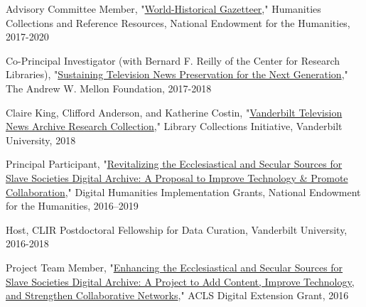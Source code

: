 \documentclass[10pt]{res} %
\begin{document}
\begin{resume}
\begin{hangparas}{.25in}{1}Advisory Committee Member, "\href{https://securegrants.neh.gov/publicquery/main.aspx?f=1\&gn=PW-253719-17}{World-Historical Gazetteer}," Humanities Collections and Reference Resources, National Endowment for the Humanities, 2017-2020\end{hangparas}

\begin{hangparas}{.25in}{1}Co-Principal Investigator (with Bernard F. Reilly of the Center for Research Libraries), "\href{https://news.vanderbilt.edu/2017/09/27/workshop-will-chart-the-future-of-television-news-preservation/}{Sustaining Television News Preservation for the Next Generation}," The Andrew W. Mellon Foundation, 2017-2018\end{hangparas}

\begin{hangparas}{.25in}{1}Claire King, Clifford Anderson, and Katherine Costin, "\href{https://news.vanderbilt.edu/2018/05/16/10-faculty-proposals-funded-through-new-library-collections-initiative}{Vanderbilt Television News Archive Research Collection}," Library Collections Initiative, Vanderbilt University, 2018\end{hangparas}

\begin{hangparas}{.25in}{1}Principal Participant, "\href{https://securegrants.neh.gov/publicquery/main.aspx?f=1\&gn=HK-250720-16}{Revitalizing the Ecclesiastical and Secular Sources for Slave Societies Digital Archive: A Proposal to Improve Technology \& Promote Collaboration}," Digital Humanities Implementation Grants, National Endowment for the Humanities, 2016–2019\end{hangparas}

\begin{hangparas}{.25in}{1}Host, CLIR Postdoctoral Fellowship for Data Curation, Vanderbilt University, 2016-2018\end{hangparas}

\begin{hangparas}{.25in}{1}Project Team Member, "\href{http://www.acls.org/research/fellow.aspx?cid=f125fd4b-41a1-e211-b90d-000c29a3451a}{Enhancing the Ecclesiastical and Secular Sources for Slave Societies Digital Archive: A Project to Add Content, Improve Technology, and Strengthen Collaborative Networks}," ACLS Digital Extension Grant, 2016\end{hangparas}


\end{resume}
\end{document}
